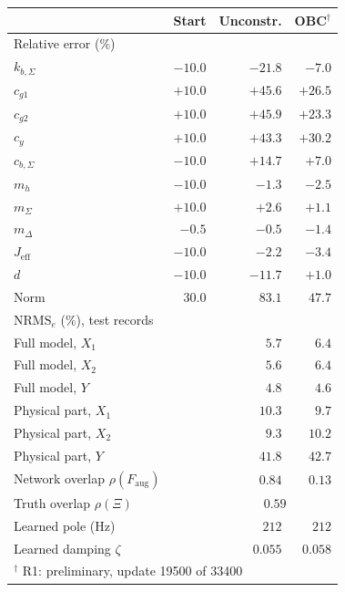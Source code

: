 \setlength{\tabcolsep}{3pt}
\begin{tabular}{l r r r}
\toprule
 & Start & Unconstr. & OBC$^\dagger$\\
\midrule
\multicolumn{4}{l}{Relative error (\%)}\\
$k_{b,\Sigma}$ & $-10.0$ & $-21.8$ & $-7.0$\\
$c_{g1}$ & $+10.0$ & $+45.6$ & $+26.5$\\
$c_{g2}$ & $+10.0$ & $+45.9$ & $+23.3$\\
$c_y$ & $+10.0$ & $+43.3$ & $+30.2$\\
$c_{b,\Sigma}$ & $-10.0$ & $+14.7$ & $+7.0$\\
$m_h$ & $-10.0$ & $-1.3$ & $-2.5$\\
$m_\Sigma$ & $+10.0$ & $+2.6$ & $+1.1$\\
$m_\Delta$ & $-0.5$ & $-0.5$ & $-1.4$\\
$J_{\mathrm{eff}}$ & $-10.0$ & $-2.2$ & $-3.4$\\
$d$ & $-10.0$ & $-11.7$ & $+1.0$\\
Norm & $30.0$ & $83.1$ & $47.7$\\
\midrule
\multicolumn{4}{l}{$\mathrm{NRMS}_e$ (\%), test records}\\
Full model, $X_1$ &  & $5.7$ & $6.4$\\
Full model, $X_2$ &  & $5.6$ & $6.4$\\
Full model, $Y$ &  & $4.8$ & $4.6$\\
Physical part, $X_1$ &  & $10.3$ & $9.7$\\
Physical part, $X_2$ &  & $9.3$ & $10.2$\\
Physical part, $Y$ &  & $41.8$ & $42.7$\\
\midrule
Network overlap $\rho(F_{\mathrm{aug}})$ &  & $0.84$ & $0.13$\\
Truth overlap $\rho(\Xi)$ & & \multicolumn{2}{c}{$0.59$}\\
Learned pole (Hz) &  & $212$ & $212$\\
Learned damping $\zeta$ &  & $0.055$ & $0.058$\\
\bottomrule
\multicolumn{4}{l}{\footnotesize $^\dagger$ R1: preliminary, update 19500 of 33400}\\
\end{tabular}
